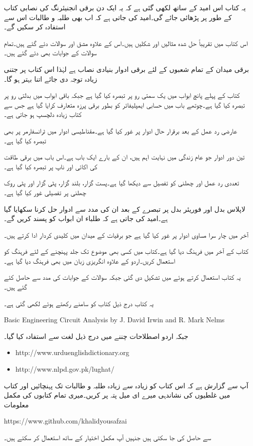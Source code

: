 یہ کتاب اس امید کے ساتھ لکھی گئی ہے کہ یہ ایک دن برقی انجنیئرنگ کی نصابی کتاب کے طور پر پڑھائی جائے گی۔امید کی جاتی ہے کہ اب بھی طلبہ و طالبات اس سے استفادہ کر سکیں گے۔


اس کتاب میں تقریباً  حل شدہ مثالیں اور  شکلیں ہیں۔اس کے علاوہ   مشق اور  سوالات دئے گئے ہیں۔تمام سوالات کے جوابات بھی دئے گئے ہیں۔

برقی میدان کے تمام شعبوں کے لئے برقی ادوار بنیادی نصاب ہے لہٰذا اس کتاب پر جتنی زیادہ توجہ دی جائے اتنا بہتر ہو گا۔

کتاب کے پہلے پانچ ابواب میں یک سمتی رو پر تبصرہ کیا گیا ہے جبکہ باقی ابواب میں بدلتی رو پر تبصرہ کیا گیا ہے۔چوتھے باب میں حسابی ایمپلیفائر کو بطور برقی پرزہ متعارف کرایا گیا ہے جس سے  کتاب زیادہ دلچسپ ہو جاتی ہے۔  

عارضی رد عمل کے بعد برقرار حال ادوار پر غور کیا گیا ہے۔مقناطیسی ادوار میں ٹرانسفارمر پر بھی تبصرہ کیا گیا ہے۔

تین دور ادوار جو عام زندگی میں نہایت اہم ہیں، ان کے بارے  ایک باب ہے۔اس باب میں برقی طاقت کی اکائی اور ناپ پر تبصرہ کیا گیا ہے۔
 

تعددی رد عمل اور چھلنی کو تفصیل سے دیکھا گیا ہے۔پست گزار، بلند گزار، پٹی گزار اور پٹی روک چھلنی پر تفصیلی غور کیا گیا ہے۔

لاپلاس بدل اور فوریئر بدل پر تبصرے کے بعد ان کی مدد سے ادوار حل کرنا سکھایا گیا ہے۔امید کی جاتی ہے کہ طلباء ان ابواب کو پسند کریں گے۔

آخر میں چار سرا مساوی ادوار پر غور کیا گیا ہے جو برقیات کے میدان میں کلیدی کردار ادا کرتے ہیں۔

کتاب کے آخر میں فرہنگ دیا گیا ہے۔کتاب میں کسی بھی موضوع تک جلد پہنچنے کے لئے فرہنگ کو استعمال کریں۔اردو کے علاوہ انگریزی زبان میں بھی فرہنگ دیا گیا ہے۔

یہ کتاب  استعمال کرتے ہوئے  میں تشکیل دی گئی جبکہ سوالات کے جوابات  کی مدد سے حاصل کئے گئے ہیں۔

یہ کتاب درج ذیل کتاب کو سامنے رکھتے ہوئے لکھی گئی ہے۔

{
\begin{otherlanguage}{english}
Basic Engineering Circuit Analysis by J. David Irwin and R. Mark Nelms
\end{otherlanguage}
}

جبکہ اردو اصطلاحات چننے میں درج ذیل لغت سے استفادہ  کیا گیا۔
{
\begin{otherlanguage}{english}
\begin{itemize}
\item
http:/\!\!/www.urduenglishdictionary.org
\item
http:/\!\!/www.nlpd.gov.pk/lughat/
\end{itemize}
\end{otherlanguage}
}
آپ سے گزارش ہے کہ اس کتاب کو زیادہ سے زیادہ طلبہ و طالبات تک پہنچائیں اور کتاب میں غلطیوں کی نشاندہی میرے  ای میل پتہ پر کریں۔میری تمام کتابوں کی مکمل  معلومات

{
\begin{otherlanguage}{english}
https:/\!\!/www.github.com/khalidyousafzai
\end{otherlanguage}
}

سے حاصل کی جا سکتی ہیں جنہیں آپ مکمل اختیار کے ساتھ استعمال کر سکتے ہیں۔
\vspace{5mm}

{}


